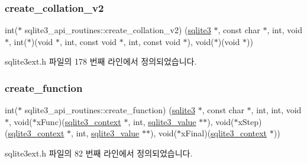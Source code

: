 \subsubsection{\texorpdfstring{create\+\_\+collation\+\_\+v2}{create\_collation\_v2}}
{\footnotesize\ttfamily int($\ast$ sqlite3\+\_\+api\+\_\+routines\+::create\+\_\+collation\+\_\+v2) (\hyperlink{sqlite3_8h_a0ef6f2646262c8a9b24368d8ac140f69}{sqlite3} $\ast$, const char $\ast$, int, void $\ast$, int($\ast$)(void $\ast$, int, const void $\ast$, int, const void $\ast$), void($\ast$)(void $\ast$))}



sqlite3ext.\+h 파일의 178 번째 라인에서 정의되었습니다.

\mbox{\label{structsqlite3__api__routines_a9f15bf465292b7176eddbf0287c770f8}} 
\subsubsection{\texorpdfstring{create\+\_\+function}{create\_function}}
{\footnotesize\ttfamily int($\ast$ sqlite3\+\_\+api\+\_\+routines\+::create\+\_\+function) (\hyperlink{sqlite3_8h_a0ef6f2646262c8a9b24368d8ac140f69}{sqlite3} $\ast$, const char $\ast$, int, int, void $\ast$, void($\ast$x\+Func)(\hyperlink{sqlite3_8h_a3b519553ffec8fc42b2356f5b1ebdc57}{sqlite3\+\_\+context} $\ast$, int, \hyperlink{sqlite3_8h_ac2fa1ecdb2290d9af6010edbd1cbc83c}{sqlite3\+\_\+value} $\ast$$\ast$), void($\ast$x\+Step)(\hyperlink{sqlite3_8h_a3b519553ffec8fc42b2356f5b1ebdc57}{sqlite3\+\_\+context} $\ast$, int, \hyperlink{sqlite3_8h_ac2fa1ecdb2290d9af6010edbd1cbc83c}{sqlite3\+\_\+value} $\ast$$\ast$), void($\ast$x\+Final)(\hyperlink{sqlite3_8h_a3b519553ffec8fc42b2356f5b1ebdc57}{sqlite3\+\_\+context} $\ast$))}



sqlite3ext.\+h 파일의 82 번째 라인에서 정의되었습니다.

\mbox{\label{structsqlite3__api__routines_a2cb97ce7512759a08f1744e24cd0294f}} 
